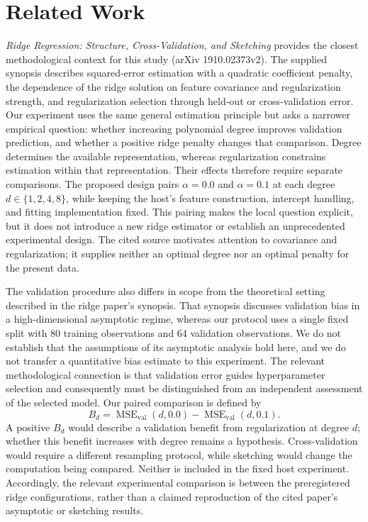 \documentclass[11pt]{article}
\begin{document}
\section{Related Work}
\emph{Ridge Regression: Structure, Cross-Validation, and Sketching} provides the closest methodological context for this study (arXiv 1910.02373v2). The supplied synopsis describes squared-error estimation with a quadratic coefficient penalty, the dependence of the ridge solution on feature covariance and regularization strength, and regularization selection through held-out or cross-validation error. Our experiment uses the same general estimation principle but asks a narrower empirical question: whether increasing polynomial degree improves validation prediction, and whether a positive ridge penalty changes that comparison. Degree determines the available representation, whereas regularization constrains estimation within that representation. Their effects therefore require separate comparisons. The proposed design pairs \(\alpha=0.0\) and \(\alpha=0.1\) at each degree \(d\in\{1,2,4,8\}\), while keeping the host's feature construction, intercept handling, and fitting implementation fixed. This pairing makes the local question explicit, but it does not introduce a new ridge estimator or establish an unprecedented experimental design. The cited source motivates attention to covariance and regularization; it supplies neither an optimal degree nor an optimal penalty for the present data.

The validation procedure also differs in scope from the theoretical setting described in the ridge paper's synopsis. That synopsis discusses validation bias in a high-dimensional asymptotic regime, whereas our protocol uses a single fixed split with 80 training observations and 64 validation observations. We do not establish that the assumptions of its asymptotic analysis hold here, and we do not transfer a quantitative bias estimate to this experiment. The relevant methodological connection is that validation error guides hyperparameter selection and consequently must be distinguished from an independent assessment of the selected model. Our paired comparison is defined by
\[
B_d=\operatorname{MSE}_{\mathrm{val}}(d,0.0)
    -\operatorname{MSE}_{\mathrm{val}}(d,0.1).
\]
A positive \(B_d\) would describe a validation benefit from regularization at degree \(d\); whether this benefit increases with degree remains a hypothesis. Cross-validation would require a different resampling protocol, while sketching would change the computation being compared. Neither is included in the fixed host experiment. Accordingly, the relevant experimental comparison is between the preregistered ridge configurations, rather than a claimed reproduction of the cited paper's asymptotic or sketching results.
\end{document}
